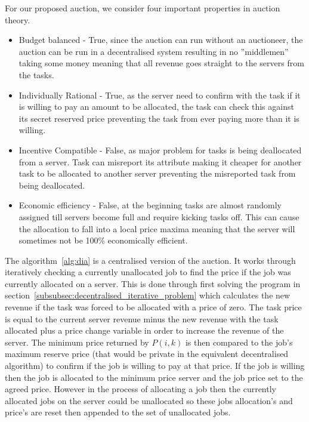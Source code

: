 For our proposed auction, we consider four important properties in auction theory.
\begin{itemize}
    \item Budget balanced - True, since the auction can run without an auctioneer, the auction can be run in a
    decentralised system resulting in no ''middlemen'' taking some money meaning that all revenue goes straight to
    the servers from the tasks.
    \item Individually Rational - True, as the server need to confirm with the task if it is willing to pay an amount
    to be allocated, the task can check this against its secret reserved price preventing the task from ever paying
    more than it is willing.
    \item Incentive Compatible - False, as major problem for tasks is being deallocated from a server. Task can
    misreport its attribute making it cheaper for another task to be allocated to another server preventing the
    misreported task from being deallocated.
    \item Economic efficiency - False, at the beginning tasks are almost randomly assigned till servers become full and
    require kicking tasks off. This can cause the allocation to fall into a local price maxima meaning that the
    server will sometimes not be 100\% economically efficient.
\end{itemize}

The algorithm~\ref{alg:dia} is a centralised version of the auction. It works through iteratively checking a currently
unallocated job to find the price if the job was currently allocated on a server. This is done through first solving
the program in section~\ref{subsubsec:decentralised_iterative_problem} which calculates the new revenue if the task was
forced to be allocated with a price of zero. The task price is equal to the current server revenue minus the new
revenue with the task allocated plus a price change variable in order to increase the revenue of the server. The
minimum price returned by $P(i, k)$ is then compared to the job's maximum reserve price (that would be private in the
equivalent decentralised algorithm) to confirm if the job is willing to pay at that price. If the job is willing then
the job is allocated to the minimum price server and the job price set to the agreed price. However in the process of
allocating a job then the currently allocated jobs on the server could be unallocated so these jobs allocation's and
price's are reset then appended to the set of unallocated jobs.

